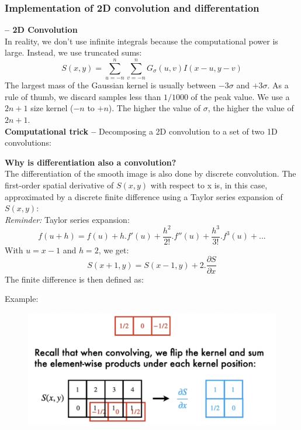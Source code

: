 \documentclass[a4paper,11pt]{article}
\begin{document}
\subsubsection{Implementation of 2D convolution and differentation}
\textbf{-- 2D Convolution}\\
In reality, we don't use infinite integrals because the computational power is large. Instead, we use truncated sums:
\[S(x,y)=\sum_{u=-n}^{n}\sum_{v=-n}^{n} G_\sigma(u,v) I(x-u,y-v)\]
The largest mass of the Gaussian kernel is usually between $-3 \sigma$ and $+3 \sigma$. As a rule of thumb, we discard samples less than $1/1000$ of the peak value.
We use a $2n+1$ size kernel ($-n$ to $+n$). The higher the value of $\sigma$, the higher the value of $2n+1$.
\vspace{5pt}\\
\textbf{Computational trick --} Decomposing a 2D convolution to a set of two 1D convolutions:
\begin{center}
\end{center}
\textbf{Why is differentiation also a convolution?}\\
The differentiation of the smooth image is also done by discrete convolution. The first-order spatial derivative of $S(x,y)$ with respect to x is, in this case, approximated by a discrete finite difference using a Taylor series expansion of $S(x,y)$:
\vspace{5pt}\\
\emph{Reminder:} Taylor series expansion:
\[f(u+h)=f(u)+h.f'(u)+\frac{h^2}{2!}.f''(u)+\frac{h^3}{3!}.f^{3}(u)+...\]
With $u=x-1$ and $h=2$, we get:
\[S(x+1,y)=S(x-1,y)+2.\frac{\partial S}{\partial x}\]
The finite difference is then defined as:
\begin{center}
\end{center}
Example:
\begin{figure}[h]
	\centering
	\includegraphics[width=.6\linewidth]{figures/diff.png}
\end{figure}
\end{document}
